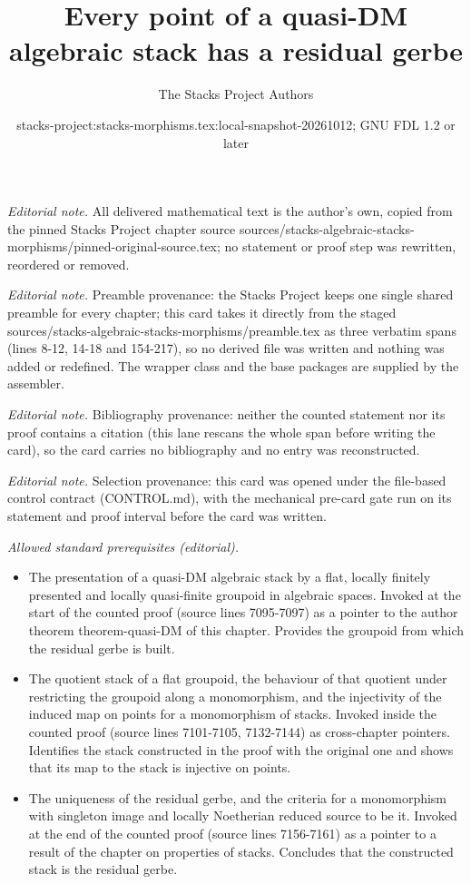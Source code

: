 \documentclass[10pt,a4paper]{amsart}
\title{Every point of a quasi-DM algebraic stack has a residual gerbe}
\author{The Stacks Project Authors}
\date{stacks-project:stacks-morphisms.tex:local-snapshot-20261012; GNU FDL 1.2 or later}
\theoremstyle{plain}
\theoremstyle{definition}
\theoremstyle{remark}
\numberwithin{equation}{subsection}
\begin{document}
\maketitle
\noindent\textit{Editorial note.} All delivered mathematical text is the author's own, copied from the pinned Stacks Project chapter source sources/stacks-algebraic-stacks-morphisms/pinned-original-source.tex; no statement or proof step was rewritten, reordered or removed.\par\medskip
\noindent\textit{Editorial note.} Preamble provenance: the Stacks Project keeps one single shared preamble for every chapter; this card takes it directly from the staged sources/stacks-algebraic-stacks-morphisms/preamble.tex as three verbatim spans (lines 8-12, 14-18 and 154-217), so no derived file was written and nothing was added or redefined. The wrapper class and the base packages are supplied by the assembler.\par\medskip
\noindent\textit{Editorial note.} Bibliography provenance: neither the counted statement nor its proof contains a citation (this lane rescans the whole span before writing the card), so the card carries no bibliography and no entry was reconstructed.\par\medskip
\noindent\textit{Editorial note.} Selection provenance: this card was opened under the file-based control contract (CONTROL.md), with the mechanical pre-card gate run on its statement and proof interval before the card was written.\par\medskip
\noindent\textit{Allowed standard prerequisites (editorial).}\begin{itemize}
\item The presentation of a quasi-DM algebraic stack by a flat, locally finitely presented and locally quasi-finite groupoid in algebraic spaces. Invoked at the start of the counted proof (source lines 7095-7097) as a pointer to the author theorem theorem-quasi-DM of this chapter. Provides the groupoid from which the residual gerbe is built.
\item The quotient stack of a flat groupoid, the behaviour of that quotient under restricting the groupoid along a monomorphism, and the injectivity of the induced map on points for a monomorphism of stacks. Invoked inside the counted proof (source lines 7101-7105, 7132-7144) as cross-chapter pointers. Identifies the stack constructed in the proof with the original one and shows that its map to the stack is injective on points.
\item The uniqueness of the residual gerbe, and the criteria for a monomorphism with singleton image and locally Noetherian reduced source to be it. Invoked at the end of the counted proof (source lines 7156-7161) as a pointer to a result of the chapter on properties of stacks. Concludes that the constructed stack is the residual gerbe.
\end{itemize}\medskip
\end{document}
